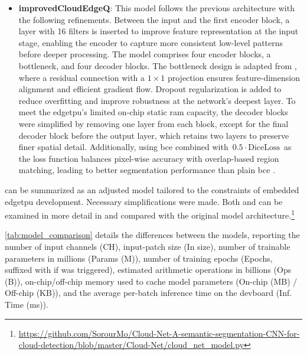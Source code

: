 {\begin{itemize}[itemsep=0.5\baselineskip]
    \item \textbf{improvedCloudEdgeQ}: This model follows the previous architecture with the following refinements.
    Between the input and the first encoder block, a  layer with 16 filters is inserted to improve feature representation at the input stage,
    enabling the encoder to capture more consistent low-level patterns before deeper processing.
    The model comprises four encoder blocks, a bottleneck, and four decoder blocks.
    The bottleneck design is adapted from , where a residual connection with a \(1\times1\) projection ensures feature-dimension alignment and efficient gradient flow.
    Dropout regularization is added to reduce overfitting and improve robustness at the network's deepest layer.
    To meet the \gls{edgetpu}'s limited on-chip static \gls{ram} capacity, the decoder blocks were simplified by removing one  layer from each block,
    except for the final decoder block before the output layer, which retains two  layers to preserve finer spatial detail.
    Additionally, using \gls{bce} combined with \(\,0.5 \cdot \text{DiceLoss}\,\) as the loss function balances pixel-wise accuracy with overlap-based region matching,
    leading to better segmentation performance than plain \gls{bce} \cite{bcedice1, bcedice2}.
\end{itemize}

 can be summarized as an adjusted  model tailored to the constraints of embedded \gls{edgetpu} development.
Necessary simplifications were made.
Both  and  can be examined in more detail in  and compared with the original  model
architecture.\footnote{\url{https://github.com/SorourMo/Cloud-Net-A-semantic-segmentation-CNN-for-cloud-detection/blob/master/Cloud-Net/cloud_net_model.py}}

\autoref{tab:model_comparison} details the differences between the models, reporting the number of input channels (CH),
input-patch size (In size), number of trainable parameters in millions (Params (M)),
number of training epochs (Epochs, suffixed with  if  was triggered),
estimated arithmetic operations in billions (Ops (B)), on-chip/off-chip memory used to cache model parameters (On-chip (MB) / Off-chip (KB)),
and the average per-batch inference time on the \gls{devboard} (Inf. Time (ms)).

}
